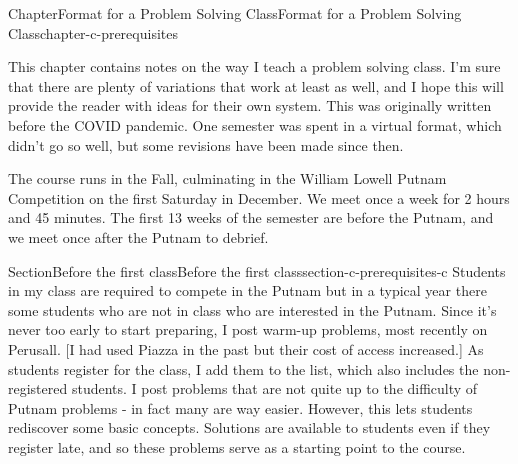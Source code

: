 \documentclass[oneside,10pt,]{book}
\numberwithin{equation}{section}
\begin{document}
\setcounter{tocdepth}{1}
\renewcommand*\contentsname{Contents}
\tableofcontents
\mainmatter
%
%
\typeout{************************************************}
\typeout{************************************************}
%
\begin{chapterptx}{Chapter}{Format for a Problem Solving Class}{}{Format for a Problem Solving Class}{}{}{chapter-c-prerequisites}
\renewcommand*{\chaptername}{Chapter}
\begin{introduction}{}%
This chapter contains notes on the way I teach a problem solving class.  I'm sure that there are plenty of variations that work at least as well, and I hope this will provide the reader with ideas for their own system. This was originally written before the COVID pandemic.  One semester was spent in a virtual format, which didn't go so well, but some revisions have been made since then.%
\par
The course runs in the Fall, culminating in the William Lowell Putnam Competition on the first Saturday in December.  We meet once a week for 2 hours and 45 minutes.  The first 13 weeks of the semester are before the Putnam, and we meet once after the Putnam to debrief.%
\end{introduction}%
%
%
\typeout{************************************************}
\typeout{************************************************}
%
\begin{sectionptx}{Section}{Before the first class}{}{Before the first class}{}{}{section-c-prerequisites-c}
Students in my class are required to compete in the Putnam but in a typical year there some students who are not in class who are interested in the Putnam.  Since it's never too early to start preparing, I post warm-up problems, most recently on Perusall. [I had used Piazza in the past but their cost of access increased.]  As students register for the class, I add them to the list, which also includes the non-registered students.  I post problems that are not quite up to the difficulty of Putnam problems - in fact many are way easier.  However, this lets students rediscover some basic concepts.  Solutions are available to students even if they register late, and so these problems serve as a starting point to the course.%
\end{sectionptx}
%
%
\typeout{************************************************}

\end{chapterptx}
\end{document}
